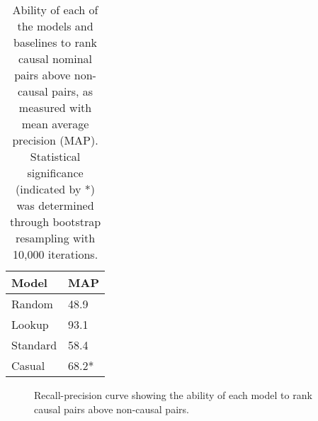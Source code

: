 \begin{table}[t!]
\begin{center}
\begin{footnotesize}
\begin{tabular}{ll}
\hline
\multicolumn{1}{l}{ Model } & \multicolumn{1}{l}{MAP} \\ %

\hline
Random 			& 48.9 	\\
Lookup			& 93.1 	\\
Standard  		& 58.4	\\
Casual  			& 68.2*	\\

\end{tabular}
\end{footnotesize}
\caption{{\small Ability of each of the models and baselines to rank causal nominal pairs above non-causal pairs, as measured with mean average precision (MAP). Statistical significance (indicated by *) was determined through bootstrap resampling with 10,000 iterations.}}
\label{tab:MAP}
\end{center}
\end{table}

\begin{figure}[t!]
\begin{center}
\caption{{\small Recall-precision curve showing the ability of each model to rank causal pairs above non-causal pairs. }}
\vspace{-6mm}
\label{fig:rpcurve_all}
\end{center}
\end{figure}

